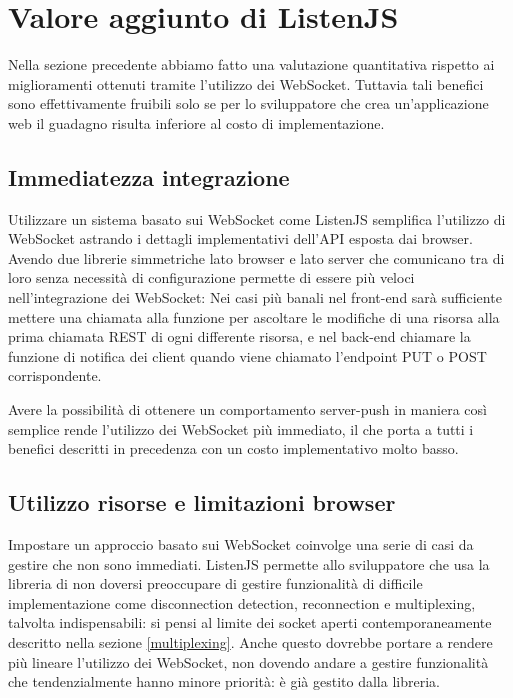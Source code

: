 \documentclass[12pt,a4paper,openright,twoside]{report}
\begin{document}
\section{Valore aggiunto di ListenJS}\label{sec_valorelistenjs}

Nella sezione precedente abbiamo fatto una valutazione quantitativa rispetto ai miglioramenti ottenuti tramite l'utilizzo dei WebSocket. Tuttavia tali benefici sono effettivamente fruibili solo se per lo sviluppatore che crea un'applicazione web il guadagno risulta inferiore al costo di implementazione.

\subsection{Immediatezza integrazione}
Utilizzare un sistema basato sui WebSocket come ListenJS semplifica l'utilizzo di WebSocket astrando i dettagli implementativi dell'API esposta dai browser. Avendo due librerie simmetriche lato browser e lato server che comunicano tra di loro senza necessità di configurazione permette di essere più veloci nell'integrazione dei WebSocket: Nei casi più banali nel front-end sarà sufficiente mettere una chiamata alla funzione per ascoltare le modifiche di una risorsa alla prima chiamata REST di ogni differente risorsa, e nel back-end chiamare la funzione di notifica dei client quando viene chiamato l'endpoint PUT o POST corrispondente.

\bigskip

Avere la possibilità di ottenere un comportamento server-push in maniera così semplice rende l'utilizzo dei WebSocket più immediato, il che porta a tutti i benefici descritti in precedenza con un costo implementativo molto basso.

\subsection{Utilizzo risorse e limitazioni browser}
Impostare un approccio basato sui WebSocket coinvolge una serie di casi da gestire che non sono immediati. ListenJS permette allo sviluppatore che usa la libreria di non doversi preoccupare di gestire funzionalità di difficile implementazione come disconnection detection, reconnection e multiplexing, talvolta indispensabili: si pensi al limite dei socket aperti contemporaneamente descritto nella sezione \ref{multiplexing}. Anche questo dovrebbe portare a rendere più lineare l'utilizzo dei WebSocket, non dovendo andare a gestire funzionalità che tendenzialmente hanno minore priorità: è già gestito dalla libreria.
\end{document}

